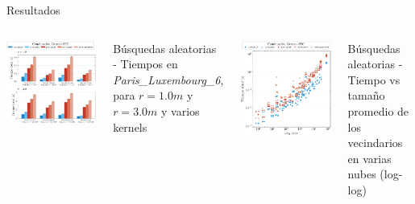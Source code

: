 \documentclass[aspectratio=169]{beamer}
\begin{document}
\begin{frame}{Resultados}
    \vspace{-1em} %
    \begin{columns}[t] %
        \includegraphics[width=0.8\linewidth]{img/paris_luxembourg_6_subsets_reduced.pdf}
        {\scriptsize \centering Búsquedas aleatorias - Tiempos en \textit{Paris\_Luxembourg\_6}, para $r=1.0m$ y $r=3.0m$ y varios kernels \par}

            \includegraphics[width=0.8\linewidth]{img/loglog_subsets.pdf}
            {\scriptsize \centering Búsquedas aleatorias - Tiempo vs tamaño promedio de los vecindarios en varias nubes (log-log) \par}    \end{columns}
\end{frame}
\end{document}
